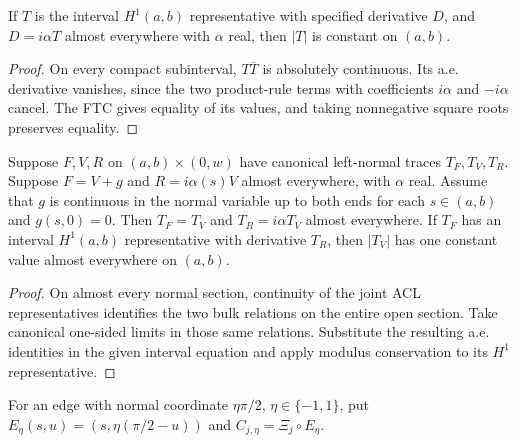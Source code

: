 \begin{lemma}
\label{lem:imaginary-derivative-modulus}
\leanok
If $T$ is the interval $H^1(a,b)$ representative with specified
derivative $D$, and $D=i\alpha T$ almost everywhere with $\alpha$ real,
then $|T|$ is constant on $(a,b)$.
\end{lemma}
\begin{proof}
\leanok
On every compact subinterval, $T\overline T$ is absolutely continuous.
Its a.e. derivative vanishes, since the two product-rule terms with
coefficients $i\alpha$ and $-i\alpha$ cancel. The FTC gives equality of its
values, and taking nonnegative square roots preserves equality.
\end{proof}

\begin{lemma}
\label{lem:boundary-mode-modulus}
\leanok
Suppose $F,V,R$ on $(a,b)\times(0,w)$ have canonical left-normal traces
$T_F,T_V,T_R$. Suppose $F=V+g$ and $R=i\alpha(s)V$ almost everywhere,
with $\alpha$ real. Assume that $g$ is continuous in the normal variable
up to both ends for each $s\in(a,b)$ and $g(s,0)=0$.
Then $T_F=T_V$ and $T_R=i\alpha T_V$ almost everywhere. If $T_F$ has
an interval $H^1(a,b)$ representative with derivative $T_R$, then
$|T_V|$ has one constant value almost everywhere on $(a,b)$.
\end{lemma}
\begin{proof}
\leanok
On almost every normal section, continuity of the joint ACL
representatives identifies the two bulk relations on the entire open
section. Take canonical one-sided limits in those same relations.
Substitute the resulting a.e. identities in the given interval equation
and apply modulus conservation to its $H^1$ representative.
\end{proof}

\begin{definition}
\label{def:edge-inward-chart}
\leanok
For an edge with normal coordinate $\eta\pi/2$, $\eta\in\{-1,1\}$,
put $E_\eta(s,u)=(s,\eta(\pi/2-u))$ and $C_{j,\eta}=\Xi_j\circ E_\eta$.
\end{definition}

